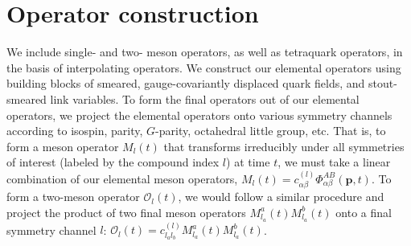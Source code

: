 \section{Operator construction}
We include single- and two- meson operators, as well as tetraquark operators, in the basis of interpolating operators. We construct our elemental operators using building blocks of smeared, gauge-covariantly displaced quark fields, and stout-smeared link variables. To form the final operators out of our elemental operators, we project the elemental operators onto various symmetry channels according to isospin, parity, $G$-parity, octahedral little group, etc. That is, to form a meson operator $M_{l}(t)$ that transforms irreducibly under all symmetries of interest (labeled by the compound index $l$) at time $t$, we must 
take a linear combination of our elemental meson operators, $M_{l}(t)=c_{\alpha \beta}^{(l)} \Phi_{\alpha \beta}^{A B}(\boldsymbol{p}, t)$. To form a two-meson operator $\mathcal{O}_l(t)$, we would follow a similar procedure and project the product of two final meson operators $M^{a}_{l_a}(t) M^{b}_{l_a}(t)$ onto a final symmetry channel $l$: $\mathcal{O}_l(t) = c^{(l)}_{l_a l_b} M^{a}_{l_a}(t) M^{b}_{l_a}(t)$.

